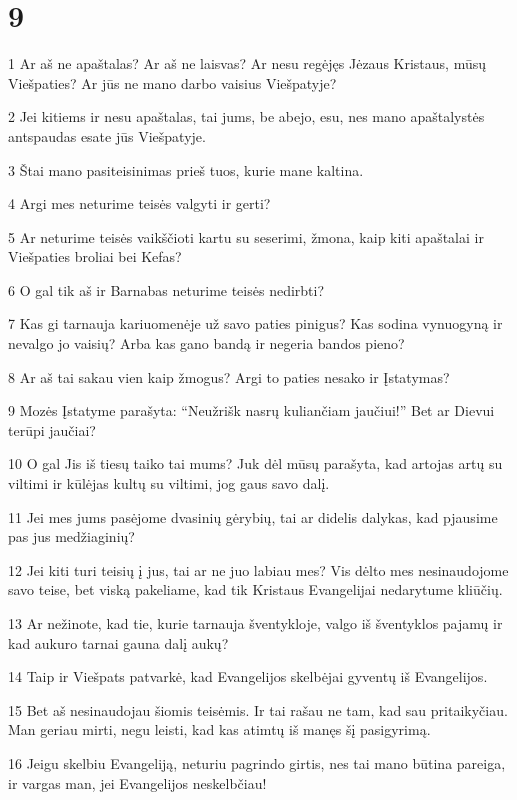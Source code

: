 \chapter{9}

\par 1 Ar aš ne apaštalas? Ar aš ne laisvas? Ar nesu regėjęs Jėzaus Kristaus, mūsų Viešpaties? Ar jūs ne mano darbo vaisius Viešpatyje? 
\par 2 Jei kitiems ir nesu apaštalas, tai jums, be abejo, esu, nes mano apaštalystės antspaudas esate jūs Viešpatyje. 
\par 3 Štai mano pasiteisinimas prieš tuos, kurie mane kaltina. 
\par 4 Argi mes neturime teisės valgyti ir gerti? 
\par 5 Ar neturime teisės vaikščioti kartu su seserimi, žmona, kaip kiti apaštalai ir Viešpaties broliai bei Kefas? 
\par 6 O gal tik aš ir Barnabas neturime teisės nedirbti? 
\par 7 Kas gi tarnauja kariuomenėje už savo paties pinigus? Kas sodina vynuogyną ir nevalgo jo vaisių? Arba kas gano bandą ir negeria bandos pieno? 
\par 8 Ar aš tai sakau vien kaip žmogus? Argi to paties nesako ir Įstatymas? 
\par 9 Mozės Įstatyme parašyta: “Neužrišk nasrų kuliančiam jaučiui!” Bet ar Dievui terūpi jaučiai? 
\par 10 O gal Jis iš tiesų taiko tai mums? Juk dėl mūsų parašyta, kad artojas artų su viltimi ir kūlėjas kultų su viltimi, jog gaus savo dalį. 
\par 11 Jei mes jums pasėjome dvasinių gėrybių, tai ar didelis dalykas, kad pjausime pas jus medžiaginių? 
\par 12 Jei kiti turi teisių į jus, tai ar ne juo labiau mes? Vis dėlto mes nesinaudojome savo teise, bet viską pakeliame, kad tik Kristaus Evangelijai nedarytume kliūčių. 
\par 13 Ar nežinote, kad tie, kurie tarnauja šventykloje, valgo iš šventyklos pajamų ir kad aukuro tarnai gauna dalį aukų? 
\par 14 Taip ir Viešpats patvarkė, kad Evangelijos skelbėjai gyventų iš Evangelijos. 
\par 15 Bet aš nesinaudojau šiomis teisėmis. Ir tai rašau ne tam, kad sau pritaikyčiau. Man geriau mirti, negu leisti, kad kas atimtų iš manęs šį pasigyrimą. 
\par 16 Jeigu skelbiu Evangeliją, neturiu pagrindo girtis, nes tai mano būtina pareiga, ir vargas man, jei Evangelijos neskelbčiau! 
